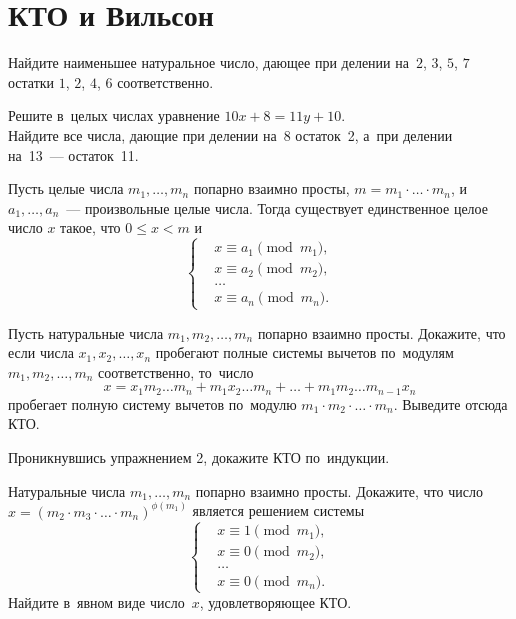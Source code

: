 
\section*{КТО и Вильсон}



Найдите наименьшее натуральное число, дающее при делении на~$2$, $3$, $5$, $7$
остатки $1$, $2$, $4$, $6$ соответственно.

\setcounter{jeolmsubproblem}{0}
\subproblem
Решите в~целых числах уравнение $10 x + 8 = 11 y + 10$.
\\
\subproblem
Найдите все числа, дающие при делении на~8 остаток~2, а~при делении на~13~---
остаток~11.

Пусть целые числа $m_1, \ldots, m_n$ попарно взаимно просты,
$m = m_1 \cdot \ldots \cdot m_n$, и~$a_1, \ldots, a_n$~--- произвольные целые
числа.
Тогда существует единственное целое число $x$ такое, что $0 \leq x < m$ и
\[
\left\{\begin{aligned} &
    x \equiv a_1 \pmod{m_1}
, \\ &
    x \equiv a_2 \pmod{m_2}
, \\ & \ldots \\ &
    x \equiv a_n \pmod{m_n}
. \end{aligned}\right.
\]

\begin{problems}

\item
Пусть натуральные числа $m_1, m_2, \ldots, m_n$ попарно взаимно просты.
Докажите, что если числа $x_1, x_2, \ldots, x_n$ пробегают полные системы
вычетов по~модулям $m_1, m_2, \ldots, m_n$ соответственно, то~число
\[
    x
=
    x_1 m_2 \ldots m_n +
    m_1 x_2 \ldots m_n +
    \ldots +
    m_1 m_2 \ldots m_{n-1} x_n
\]
пробегает полную систему вычетов по~модулю
$m_1 \cdot m_2 \cdot \ldots \cdot m_n$.
Выведите отсюда КТО.

\item
Проникнувшись упражнением 2, докажите КТО по~индукции.

\item
\subproblem
Натуральные числа $m_1, \ldots, m_n$ попарно взаимно просты.
Докажите, что число
\(
    x = (m_2 \cdot m_3 \cdot \ldots \cdot m_n)^{\phi(m_1)}
\)
является решением системы
\[
\left\{\begin{aligned} &
    x \equiv 1 \pmod{m_1}
, \\ &
    x \equiv 0 \pmod{m_2}
, \\ & \ldots \\ &
    x \equiv 0 \pmod{m_n}
. \end{aligned}\right.
\]
\subproblem
Найдите в~явном виде число~$x$, удовлетворяющее КТО.

\end{problems}

